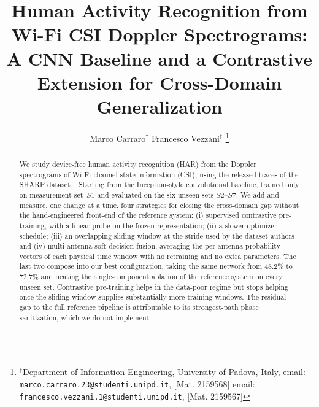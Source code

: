 \documentclass[10pt, conference, letterpaper]{IEEEtran}
\begin{document}
\title{Human Activity Recognition from Wi-Fi CSI Doppler Spectrograms:\\
A CNN Baseline and a Contrastive Extension for Cross-Domain Generalization}

\author{\; \qquad Marco Carraro$^\dag$ \quad \; Francesco Vezzani$^\dag$
\thanks{$^\dag$Department of Information Engineering, University of Padova, Italy, \newline
email: \texttt{marco.carraro.23@studenti.unipd.it}, [Mat. 2159568]\newline
email: \texttt{francesco.vezzani.1@studenti.unipd.it}, [Mat. 2159567]}
}

\maketitle

\begin{abstract}
We study device-free human activity recognition (HAR) from the Doppler
spectrograms of Wi-Fi channel-state information (CSI), using the
released traces of the SHARP dataset~\cite{sharp,csidataset}. Starting from the
Inception-style convolutional baseline, trained
only on measurement set~$S1$ and evaluated on the six unseen sets
$S2$--$S7$. We add and measure, one change at a time, four strategies for
closing the cross-domain gap without the hand-engineered front-end of the
reference system: (i) supervised contrastive pre-training, with a linear probe
on the frozen representation; (ii) a slower optimizer schedule; (iii) an
overlapping sliding window at the stride used by the dataset authors and (iv) 
multi-antenna soft
decision fusion, averaging the per-antenna probability vectors of each
physical time window with no retraining and no extra parameters. The last two
compose into our best configuration, taking the same network from
$48.2\%$ to $\mathbf{72.7\%}$ and beating the single-component ablation of the
reference system on every unseen set. Contrastive pre-training helps in the
data-poor regime but stops helping once the sliding window supplies
substantially more training windows. The residual gap to the full reference
pipeline is attributable to its strongest-path phase sanitization, which we
do not implement.
\end{abstract}















\end{document}
